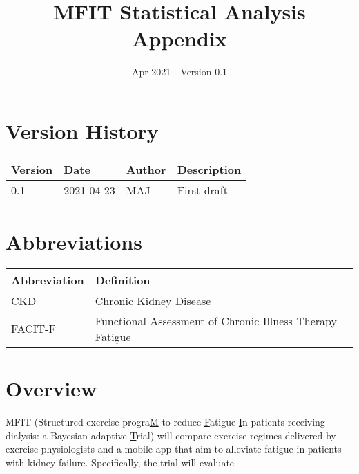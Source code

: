\documentclass[
]{article}
\title{MFIT Statistical Analysis Appendix}
\subtitle{}
\author{}
\date{\vspace{-2.5em}Apr 2021 - Version 0.1}
\begin{document}
\maketitle

{
\setcounter{tocdepth}{2}
\tableofcontents
}
\hypertarget{version-history}{%
\section*{Version History}\label{version-history}}

\begin{center}
    \begin{tabular}{lllp{5cm}}
    \hline
    Version & Date & Author & Description \\ \hline
    0.1 & 2021-04-23 & MAJ & First draft \\
    \hline
    \end{tabular}
\end{center}

\hypertarget{abbreviations}{%
\section*{Abbreviations}\label{abbreviations}}

\begin{table}[H]
\centering
\begin{tabular}{ll}
\toprule
Abbreviation & Definition\\
\midrule
CKD & Chronic Kidney Disease \\
FACIT-F & Functional Assessment of Chronic Illness Therapy – Fatigue\\
\bottomrule
\end{tabular}
\end{table}

\clearpage

\hypertarget{overview}{%
\section{Overview}\label{overview}}

MFIT (Structured exercise progra\underline{M} to reduce \underline{F}atigue \underline{I}n patients receiving dialysis: a Bayesian adaptive \underline{T}rial) will compare exercise regimes delivered by exercise physiologists and a mobile-app that aim to alleviate fatigue in patients with kidney failure.
Specifically, the trial will evaluate
\end{document}
